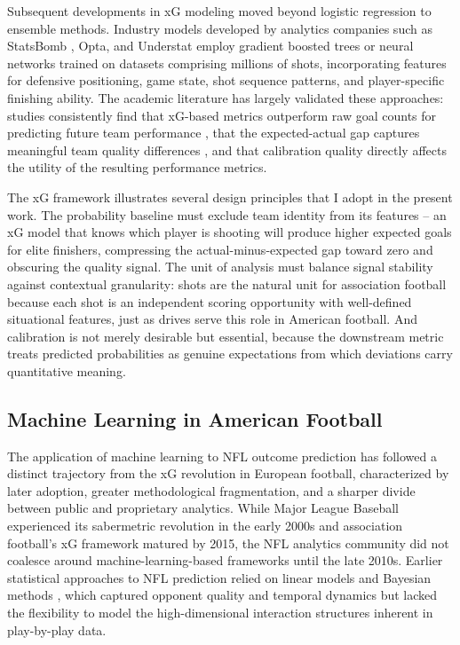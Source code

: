 Subsequent developments in xG modeling moved beyond logistic regression to ensemble methods. Industry models developed by analytics companies such as StatsBomb \parencite{statsbomb2019opendata}, Opta, and Understat employ gradient boosted trees or neural networks trained on datasets comprising millions of shots, incorporating features for defensive positioning, game state, shot sequence patterns, and player-specific finishing ability. The academic literature has largely validated these approaches: studies consistently find that xG-based metrics outperform raw goal counts for predicting future team performance \parencite{rathke2017expectedgoals,anzer2021goal}, that the expected-actual gap captures meaningful team quality differences \parencite{eggels2016expected}, and that calibration quality directly affects the utility of the resulting performance metrics.

The xG framework illustrates several design principles that I adopt in the present work. The probability baseline must exclude team identity from its features  -- an xG model that knows which player is shooting will produce higher expected goals for elite finishers, compressing the actual-minus-expected gap toward zero and obscuring the quality signal. The unit of analysis must balance signal stability against contextual granularity: shots are the natural unit for association football because each shot is an independent scoring opportunity with well-defined situational features, just as drives serve this role in American football. And calibration is not merely desirable but essential, because the downstream metric treats predicted probabilities as genuine expectations from which deviations carry quantitative meaning.

\subsection{Machine Learning in American Football}
\label{sec:ml-nfl}

The application of machine learning to NFL outcome prediction has followed a distinct trajectory from the xG revolution in European football, characterized by later adoption, greater methodological fragmentation, and a sharper divide between public and proprietary analytics. While Major League Baseball experienced its sabermetric revolution in the early 2000s \parencite{lewis2003moneyball} and association football's xG framework matured by 2015, the NFL analytics community did not coalesce around machine-learning-based frameworks until the late 2010s. Earlier statistical approaches to NFL prediction relied on linear models and Bayesian methods \parencite{harville1980predictions,glickman1998statespacenfl}, which captured opponent quality and temporal dynamics but lacked the flexibility to model the high-dimensional interaction structures inherent in play-by-play data.

